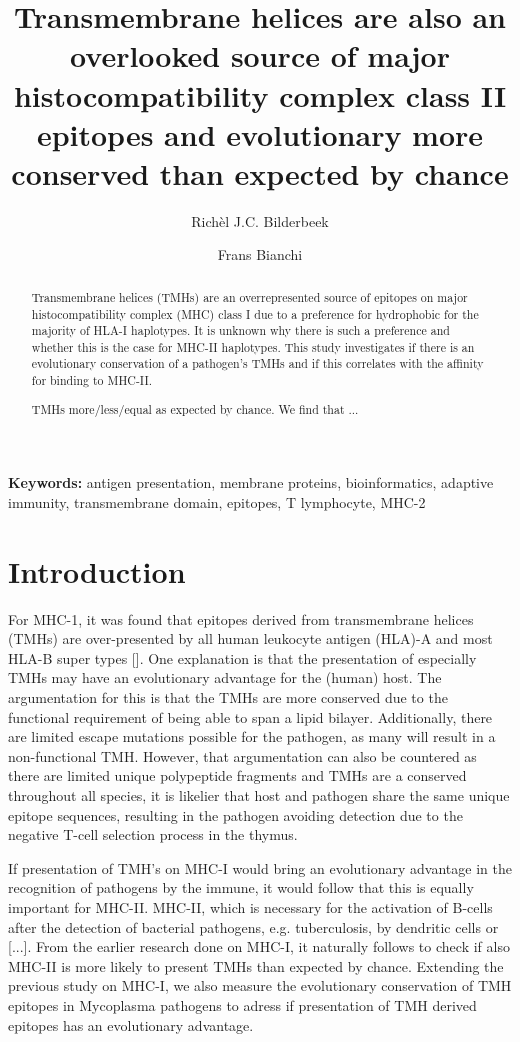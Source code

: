 \documentclass{article}
\title{
  Transmembrane helices are also 
  an overlooked source of major histocompatibility complex class II epitopes
  and evolutionary more conserved than expected by chance
}
\author[1]{Rich\`el J.C. Bilderbeek}
\author[2]{Frans Bianchi}
\affil[1]{Groningen Institute for Evolutionary Life Sciences, University of 
Groningen, Groningen, The Netherlands}
\affil[2]{Frans' Institute, University of Groningen, Groningen, The Netherlands}
\begin{document}
\maketitle

\begin{abstract}

Transmembrane helices (TMHs) are an overrepresented source of epitopes on major 
histocompatibility complex (MHC) class I due to a preference for hydrophobic 
for the majority of HLA-I haplotypes. It is unknown why there is such a 
preference and whether  this is the case for MHC-II haplotypes. This study 
investigates if there is an evolutionary conservation of a pathogen’s TMHs 
and if this correlates with the affinity for binding to MHC-II. 

TMHs more/less/equal as expected by chance. We ﬁnd that ...

\end{abstract}

{\bf Keywords:} antigen presentation, membrane proteins, bioinformatics, 
adaptive immunity, transmembrane domain, epitopes, T lymphocyte, MHC-2

\section{Introduction}

For MHC-1, it was found that epitopes derived from transmembrane helices (TMHs)
are over-presented by all human leukocyte antigen (HLA)-A and most HLA-B super 
types [\cite{bianchi2017transmembrane}]. One explanation is that the 
presentation of especially TMHs may have an evolutionary advantage for 
the (human) host. The argumentation for this is that the TMHs are more 
conserved due to the functional requirement of being able to span a lipid 
bilayer. Additionally, there are limited escape mutations possible for the 
pathogen, as many will result in a non-functional TMH. 
However, that argumentation can also be countered as there are limited unique 
polypeptide fragments and TMHs are a conserved throughout all species, it is 
likelier that host and pathogen share the same unique epitope sequences, 
resulting in the pathogen avoiding detection due to the negative T-cell 
selection process in the thymus.  

If presentation of TMH’s on MHC-I would bring an evolutionary advantage 
in the recognition of pathogens by the immune, 
it would follow that this is equally important for MHC-II. 
MHC-II, which is necessary for the activation of B-cells after the detection 
of bacterial pathogens, e.g.  tuberculosis, by dendritic cells or [...]. 
From the earlier research done on MHC-I, it naturally follows to check if 
also MHC-II is more likely to present TMHs than expected by chance. 
Extending the previous study on MHC-I, we also measure the evolutionary 
conservation of TMH epitopes in Mycoplasma pathogens to adress if 
presentation of TMH derived epitopes has an evolutionary advantage.
\end{document}
